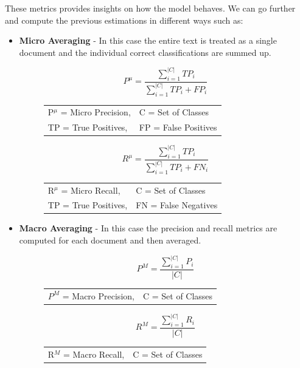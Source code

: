 These metrics provides insights on how the model behaves. We can go further and compute the previous estimations in different ways such as:
\begin{itemize}
	\item \textbf{Micro Averaging} - In this case the entire text is treated as a single document and the individual correct classifications are summed up.	\\
    \begin{figure}[H]
      \centering
      \[ P^{\mu} = \frac{\sum_{i=1}^{|C|} TP_i}{\sum_{i=1}^{|C|} TP_i + FP_i} \]
      \begin{tabular}{ll}
        P$^{\mu}$ = Micro Precision, & C = Set of Classes\\
        TP = True Positives, & FP = False Positives
      \end{tabular}
	\end{figure}
    
     \begin{figure}[H]
      \centering
      \[ R^{\mu} = \frac{\sum_{i=1}^{|C|} TP_i}{\sum_{i=1}^{|C|} TP_i + FN_i} \]
      \begin{tabular}{ll}
        R$^{\mu}$ = Micro Recall, & C = Set of Classes\\
        TP = True Positives, & FN = False Negatives
      \end{tabular}
	\end{figure}
    \item \textbf{Macro Averaging} - In this case the precision and recall metrics are computed for each document and then averaged.\\    	
	
	\begin{figure}[H]
      \centering
      \[ P^{M} = \frac{\sum_{i=1}^{|C|} P_i}{|C|} \]
      \begin{tabular}{ll}
        $P^{M}$ = Macro Precision, & C = Set of Classes\\
      \end{tabular}
	\end{figure}
    
    \begin{figure}[H]
      \centering
      \[ R^{M} = \frac{\sum_{i=1}^{|C|} R_i}{|C|} \]
      \begin{tabular}{ll}
        R$^{M}$ = Macro Recall, & C = Set of Classes\\
      \end{tabular}
	\end{figure}
\end{itemize}

